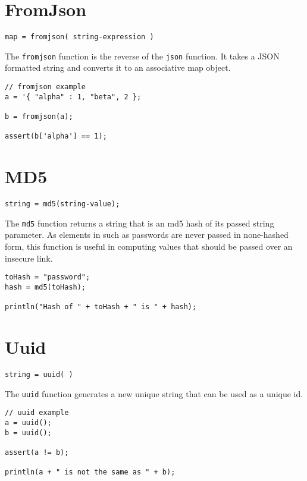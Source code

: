 \section{FromJson}

\begin{Verbatim}
map = fromjson( string-expression )
\end{Verbatim}

The \Verb+fromjson+ function is the reverse of the \verb+json+ function. It takes a JSON formatted string and converts it to an associative map object.

\begin{lstlisting}[caption={FromJson example}]
// fromjson example
a = '{ "alpha" : 1, "beta", 2 };

b = fromjson(a);

assert(b['alpha'] == 1);

\end{lstlisting}

\section{MD5}
\begin{Verbatim}
string = md5(string-value);
\end{Verbatim}

The \Verb+md5+ function returns a string that is an md5 hash of its passed string parameter. As elements in \Rapture such as passwords are never passed in none-hashed form, this function is useful in computing values that should be passed over an insecure link.

\begin{lstlisting}[caption={MD5 example}]
toHash = "password";
hash = md5(toHash);

println("Hash of " + toHash + " is " + hash);
\end{lstlisting}

\section{Uuid}
\begin{Verbatim}
string = uuid( )
\end{Verbatim}

The \Verb+uuid+ function generates a new unique string that can be used as a unique id.

\begin{lstlisting}[caption={UUID example}]
// uuid example
a = uuid();
b = uuid();

assert(a != b);

println(a + " is not the same as " + b);

\end{lstlisting}

